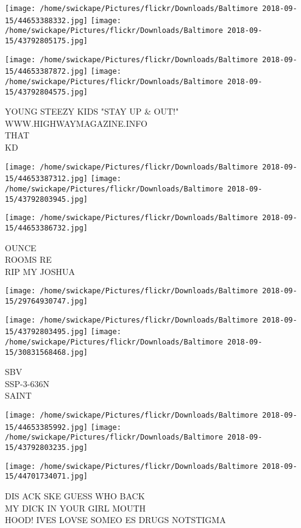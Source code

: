 \documentclass[10pt,letterpaper]{article}
\begin{document}
\texttt{[image: /home/swickape/Pictures/flickr/Downloads/Baltimore 2018-09-15/44653388332.jpg]}
\texttt{[image: /home/swickape/Pictures/flickr/Downloads/Baltimore 2018-09-15/43792805175.jpg]}

\texttt{[image: /home/swickape/Pictures/flickr/Downloads/Baltimore 2018-09-15/44653387872.jpg]}
\texttt{[image: /home/swickape/Pictures/flickr/Downloads/Baltimore 2018-09-15/43792804575.jpg]}

YOUNG STEEZY KIDS "STAY UP \& OUT!"\\
WWW.HIGHWAYMAGAZINE.INFO\\
THAT\\
KD
\pagebreak

\texttt{[image: /home/swickape/Pictures/flickr/Downloads/Baltimore 2018-09-15/44653387312.jpg]}
\texttt{[image: /home/swickape/Pictures/flickr/Downloads/Baltimore 2018-09-15/43792803945.jpg]}

\texttt{[image: /home/swickape/Pictures/flickr/Downloads/Baltimore 2018-09-15/44653386732.jpg]}

OUNCE\\
ROOMS RE\\
RIP MY JOSHUA
\pagebreak

\texttt{[image: /home/swickape/Pictures/flickr/Downloads/Baltimore 2018-09-15/29764930747.jpg]}

\vspace{0.25in}
\texttt{[image: /home/swickape/Pictures/flickr/Downloads/Baltimore 2018-09-15/43792803495.jpg]}
\texttt{[image: /home/swickape/Pictures/flickr/Downloads/Baltimore 2018-09-15/30831568468.jpg]}

SBV\\
SSP{-}3{-}636N\\
SAINT
\pagebreak

\texttt{[image: /home/swickape/Pictures/flickr/Downloads/Baltimore 2018-09-15/44653385992.jpg]}
\texttt{[image: /home/swickape/Pictures/flickr/Downloads/Baltimore 2018-09-15/43792803235.jpg]}

\vspace{0.25in}
\texttt{[image: /home/swickape/Pictures/flickr/Downloads/Baltimore 2018-09-15/44701734071.jpg]}

DIS ACK SKE GUESS WHO BACK\\
MY DICK IN YOUR GIRL MOUTH\\
HOOD!  IVES LOVSE SOMEO ES DRUGS NOTSTIGMA
\pagebreak
\end{document}
